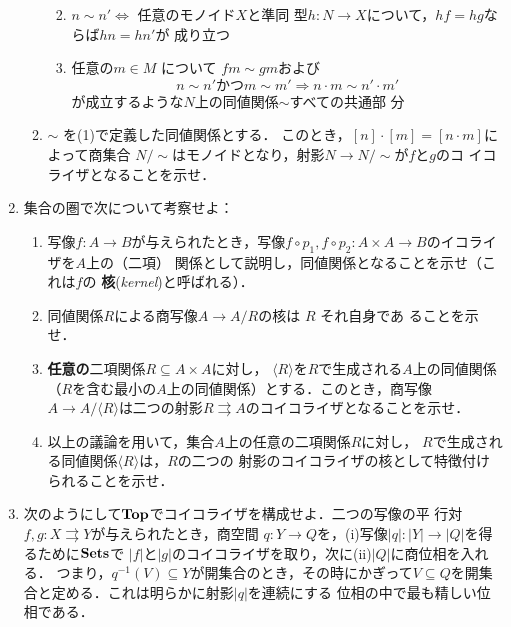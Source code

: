 \begin{enumerate}
\begin{enumerate}
	      \begin{enumerate}
	       \renewcommand{\labelenumiii}{(\alph{enumii}) }
	       \item $n \sim n' \Leftrightarrow$ 任意のモノイド$X$と準同
		     型$h: N \to X$について，$hf = hg$ならば$hn = hn'$が
		     成り立つ
	       \item 任意の$m \in M$ について $fm \sim gm$および
		     \[
		      n \sim n' \text{かつ} m \sim m' \Rightarrow
		       n \cdot m \sim n' \cdot m'
		     \]
		     が成立するような$N$上の同値関係$\sim$すべての共通部
		     分
	      \end{enumerate}
	\item $\sim$ を(1)で定義した同値関係とする．
	      このとき，$[n]\cdot[m] = [n \cdot m]$によって商集合
	      $N/\sim$はモノイドとなり，射影$N \to N/\sim$が$f$と$g$のコ
	      イコライザとなることを示せ．
       \end{enumerate}
 \item 集合の圏で次について考察せよ：
       \begin{enumerate}
	\item 写像$f: A \to B$が与えられたとき，写像$f \circ p_1, f
	      \circ p_2 : A \times A \to B$のイコライザを$A$上の（二項）
	      関係として説明し，同値関係となることを示せ（これは$f$の
	      {\bfseries 核}({\itshape kernel})と呼ばれる）．
	\item 同値関係$R$による商写像$A \to A/R$の核は $R$ それ自身であ
	      ることを示せ．
	\item {\bfseries 任意の}二項関係$R \subseteq A \times A$に対し，
	      $\langle R \rangle$を$R$で生成される$A$上の同値関係
	      （$R$を含む最小の$A$上の同値関係）とする．このとき，商写像
	      $A \to A / \langle R \rangle$は二つの射影$R
	      \rightrightarrows A$のコイコライザとなることを示せ．
	\item 以上の議論を用いて，集合$A$上の任意の二項関係$R$に対し，
	      $R$で生成される同値関係$\langle R \rangle$は，$R$の二つの
	      射影のコイコライザの核として特徴付けられることを示せ．
       \end{enumerate}
 \item 次のようにして${\bf Top}$でコイコライザを構成せよ．二つの写像の平
       行対 $f, g: X \rightrightarrows Y$が与えられたとき，商空間
       $q: Y \to Q$を，(i)写像$|q|: |Y| \to |Q|$を得るために$\mathbf{Sets}$で
       $|f|$と$|g|$のコイコライザを取り，次に(ii)$|Q|$に商位相を入れる．
       つまり，$q^{-1}(V) \subseteq Y$が開集合のとき，その時にかぎって$V
       \subseteq Q$を開集合と定める．これは明らかに射影$|q|$を連続にする
       位相の中で最も精しい位相である．
\end{enumerate}
